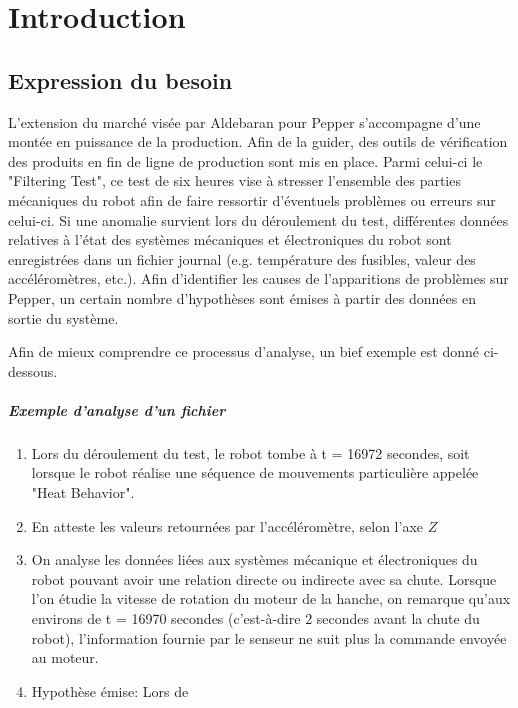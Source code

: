 \chapter{Introduction}
\label{Introduction}
\thispagestyle{fancy}

\section{Expression du besoin}
\label{Introduction:Expression du besoin}
L'extension du marché visée par Aldebaran pour Pepper s'accompagne d'une montée en puissance de la production. Afin de la guider, des outils de vérification des produits en fin de ligne de production sont mis en place. Parmi celui-ci le "Filtering Test", ce test de six heures vise à stresser l'ensemble des parties mécaniques du robot afin de faire ressortir d'éventuels problèmes ou erreurs sur celui-ci. Si une anomalie survient lors du déroulement du test, différentes données relatives à l'état des systèmes mécaniques et électroniques du robot sont enregistrées dans un fichier journal (e.g. température des fusibles, valeur des accéléromètres, etc.). Afin d'identifier les causes de l'apparitions de problèmes sur Pepper, un certain nombre d'hypothèses sont émises à partir des données en sortie du système. 

Afin de mieux comprendre ce processus d'analyse, un bief exemple est donné ci-dessous. 

\paragraph{Exemple d'analyse d'un fichier}
\label{Introduction:Expression du besoin:Exemple d'analyse d'un fichier}
\begin{enumerate}
	\item Lors du déroulement du test, le robot tombe à t = 16972 secondes, soit lorsque le robot réalise une séquence de mouvements particulière appelée "Heat Behavior".
	\item En atteste les valeurs retournées par l'accéléromètre, selon l'axe $Z$
	\item On analyse les données liées aux systèmes mécanique et électroniques du robot pouvant avoir une relation directe ou indirecte avec sa chute.  
	Lorsque l'on étudie la vitesse de rotation du moteur de la hanche, on remarque qu'aux environs de  t = 16970 secondes (c'est-à-dire 2 secondes avant la chute du robot), l'information fournie par le senseur ne suit plus la commande  envoyée au moteur.
	\item Hypothèse émise: Lors de 
\end{enumerate}

